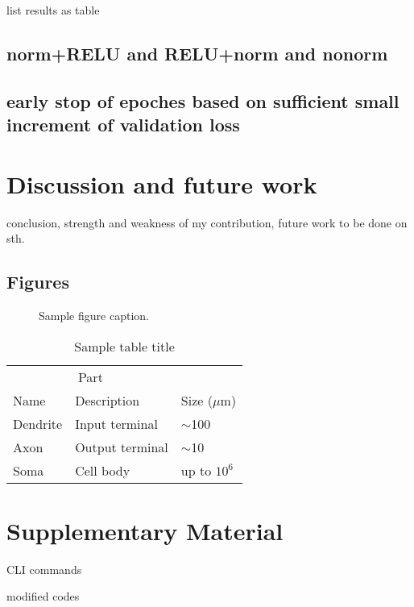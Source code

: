 \documentclass{article}
\begin{document}
list results as table

\subsection{norm+RELU and RELU+norm and nonorm}



\subsection{early stop of epoches based on sufficient small increment of validation loss}



\section{Discussion and future work}


conclusion, strength and weakness of my contribution, future work to be done on sth.



\subsection*{Figures}


\begin{figure}
  \centering
  \label{samplefigure}
  \fbox{\rule[-.5cm]{0cm}{4cm} \rule[-.5cm]{4cm}{0cm}}
  \caption{Sample figure caption.}
\end{figure}


\begin{table}
  \caption{Sample table title}
  \label{sample-table}
  \centering
  \begin{tabular}{lll}
    \toprule
    \multicolumn{2}{c}{Part}                   \\
    \cmidrule(r){1-2}
    Name     & Description     & Size ($\mu$m) \\
    \midrule
    Dendrite & Input terminal  & $\sim$100     \\
    Axon     & Output terminal & $\sim$10      \\
    Soma     & Cell body       & up to $10^6$  \\
    \bottomrule
  \end{tabular}
\end{table}


\section*{Supplementary Material}

CLI commands

modified codes



\end{document}
